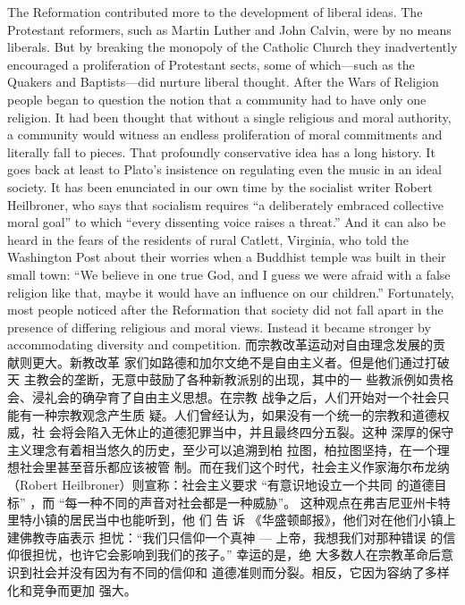 \begin{paracol}{2}
\switchcolumn*
The Reformation contributed more to the development of
liberal ideas. The Protestant reformers, such as Martin Luther
and John Calvin, were by no means liberals. But by breaking
the monopoly of the Catholic Church they inadvertently encouraged a proliferation of Protestant sects, some of which---such as the Quakers and Baptists---did nurture liberal thought.
After the Wars of Religion people began to question the notion
that a community had to have only one religion. It had been
thought that without a single religious and moral authority, a
community would witness an endless proliferation of moral commitments and literally fall to pieces. That profoundly conservative idea has a long history. It goes back at least to Plato's
insistence on regulating even the music in an ideal society. It
has been enunciated in our own time by the socialist writer
Robert Heilbroner, who says that socialism requires ``a deliberately embraced collective moral goal'' to which ``every dissenting voice raises a threat.'' And it can also be heard in the fears of
the residents of rural Catlett, Virginia, who told the Washington
Post about their worries when a Buddhist temple was built in
their small town: ``We believe in one true God, and I guess we
were afraid with a false religion like that, maybe it would have
an influence on our children.'' Fortunately, most people noticed
after the Reformation that society did not fall apart in the presence of differing religious and moral views. Instead it became
stronger by accommodating diversity and competition.
\switchcolumn
而宗教改革运动对自由理念发展的贡献则更大。新教改革
家们如路德和加尔文绝不是自由主义者。但是他们通过打破天
主教会的垄断，无意中鼓励了各种新教派别的出现，其中的一
些教派例如贵格会、浸礼会的确孕育了自由主义思想。在宗教
战争之后，人们开始对一个社会只能有一种宗教观念产生质
疑。人们曾经认为，如果没有一个统一的宗教和道德权威，社
会将会陷入无休止的道德犯罪当中，并且最终四分五裂。这种
深厚的保守主义理念有着相当悠久的历史，至少可以追溯到柏
拉图，柏拉图坚持，在一个理想社会里甚至音乐都应该被管
制。而在我们这个时代，社会主义作家海尔布龙纳（Robert Heilbroner）则宣称：社会主义要求 “有意识地设立一个共同
的道德目标” ，而 “每一种不同的声音对社会都是一种威胁”。
这种观点在弗吉尼亚州卡特里特小镇的居民当中也能听到，他
们 告 诉 《华盛顿邮报》，他们对在他们小镇上建佛教寺庙表示
担忧：“我们只信仰一个真神 --- 上帝，我想我们对那种错误
的信仰很担忧，也许它会影响到我们的孩子。” 幸运的是，绝
大多数人在宗教革命后意识到社会并没有因为有不同的信仰和
道德准则而分裂。相反，它因为容纳了多样化和竞争而更加
强大。


\end{paracol}
